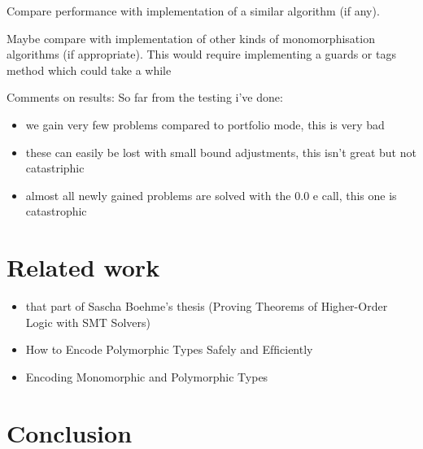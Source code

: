\documentclass{article}
\begin{document}
Compare performance with implementation of a similar algorithm (if any).

Maybe compare with implementation of other kinds of monomorphisation algorithms (if appropriate). This would require implementing a guards or tags method which could take a while

Comments on results:
So far from the testing i've done:
\begin{itemize}
   \item we gain very few problems compared to portfolio mode, this is very bad
   \item these can easily be lost with small bound adjustments, this isn't great but not catastriphic
   \item almost all newly gained problems are solved with the 0.0 e call, this one is catastrophic
\end{itemize}

\section{Related work}

\begin{itemize}
    \item that part of Sascha Boehme's thesis (Proving Theorems of Higher-Order Logic with SMT Solvers)
    \item How to Encode Polymorphic Types Safely and Efﬁciently
    \item Encoding Monomorphic and Polymorphic Types
\end{itemize}

\section{Conclusion}
\end{document}
